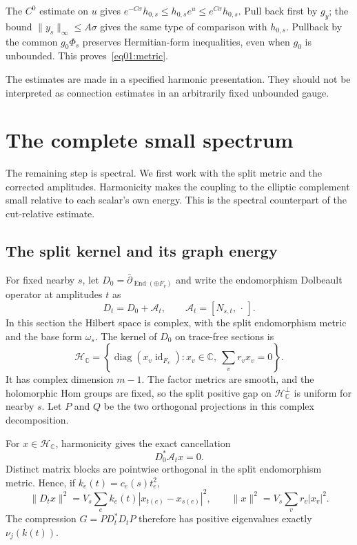 \documentclass[11pt]{amsart}
\theoremstyle{definition}
\theoremstyle{remark}
\newcommand{\db}{\bar\partial}
\newcommand{\End}{\operatorname{End}}
\newcommand{\diag}{\operatorname{diag}}
\newcommand{\id}{\operatorname{id}}
\newcommand{\CC}{\mathbb C}
\newcommand{\HH}{\mathcal H}
\begin{document}
The \(C^0\) estimate on \(u\) gives
\(e^{-C\sigma}h_{0,s}\leq h_{0,s}e^u\leq
e^{C\sigma}h_{0,s}\). Pull back first by \(g_y\);
the bound \(\|y_s\|_\infty\leq A\sigma\) gives the same type
of comparison with \(h_{0,s}\).
Pullback by the common \(g_0\Phi_s\) preserves Hermitian-form
inequalities, even when \(g_0\) is unbounded.
This proves~\eqref{eq01:metric}.

The estimates are made in a specified harmonic presentation.
They should not be interpreted as connection estimates in an
arbitrarily fixed unbounded gauge.

\section{The complete small spectrum}\label{sec05:spectrum}

The remaining step is spectral. We first work with the split metric
and the corrected amplitudes. Harmonicity makes the coupling to
the elliptic complement small relative to each scalar's own energy.
This is the spectral counterpart of the cut-relative estimate.

\subsection{The split kernel and its graph energy}

For fixed nearby \(s\), let \(D_0=\db_{\End(\oplus F_v)}\)
and write the endomorphism Dolbeault operator at amplitudes \(t\) as
\[
 D_t=D_0+\mathcal A_t,\qquad \mathcal A_t=[N_{s,t},\,\cdot\,].
\]
In this section the Hilbert space is complex, with the split
endomorphism metric and the base form \(\omega_s\).
The kernel of \(D_0\) on trace-free sections is
\[
 \HH_{\CC}
 =\left\{\diag(x_v\id_{F_v}):x_v\in\CC,\
                                  \sum_vr_vx_v=0\right\}.
\]
It has complex dimension \(m-1\). The factor metrics are smooth,
and the holomorphic Hom groups are fixed, so the split positive
gap on \(\HH_{\CC}^{\perp}\) is uniform for nearby \(s\).
Let \(P\) and \(Q\) be the two orthogonal projections in this
complex decomposition.

For \(x\in\HH_{\CC}\), harmonicity gives the exact cancellation
\begin{equation}\label{eq05:cancellation}
 D_0^*\mathcal A_tx=0.
\end{equation}
Distinct matrix blocks are pointwise orthogonal in the split
endomorphism metric. Hence, if
\(k_e(t)=c_e(s)t_e^2\),
\begin{equation}\label{eq05:graphenergy}
 \|D_tx\|^2=V_s\sum_e k_e(t)|x_{t(e)}-x_{s(e)}|^2,\qquad
 \|x\|^2=V_s\sum_vr_v|x_v|^2.
\end{equation}
The compression \(G=P D_t^*D_tP\) therefore has positive
eigenvalues exactly \(\nu_j(k(t))\).
\end{document}
